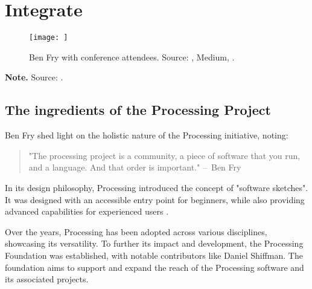 \section{Integrate}

\begin{figure}[h] 
    \centering 
    \texttt{[image: ]} 
    \caption[Ben Fry at PCD 2018]{Ben Fry with conference attendees. Source: , Medium, \citeyear{guptaBenFryConference2018}.}
    \label{figure:benfry-pcd}  
  \end{figure}
  \textbf{Note.} Source: \textcite{guptaBenFryConference2018}.
  
  \subsection{The ingredients of the Processing Project}

  Ben Fry shed light on the holistic nature of the Processing initiative, noting:
  \begin{quote}
  "The processing project is a community, a piece of software that you run, and a language. And that order is important." – Ben Fry \parencite[19:22]{artsatmit2017CASTSymposium2017}
  \end{quote}
  
  In its design philosophy, Processing introduced the concept of "software sketches". It was designed with an accessible entry point for beginners, while also providing advanced capabilities for experienced users \parencite{reasProcessingProgrammingMedia2006}.
  
  Over the years, Processing has been adopted across various disciplines, showcasing its versatility. To further its impact and development, the Processing Foundation was established, with notable contributors like Daniel Shiffman. The foundation aims to support and expand the reach of the Processing software and its associated projects.
    
  
  
  
  
  
  
  
  